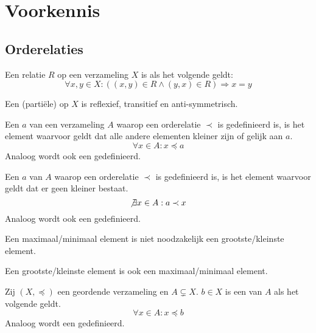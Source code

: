 \documentclass[main.tex]{subfiles}
\begin{document}
\chapter{Voorkennis}
\label{cha:voorkennis}

\section{Orderelaties}
\label{sec:orderelaties}


\begin{de}
  Een relatie $R$ op een verzameling $X$ is  als het volgende geldt:
  \[ \forall x,y \in X: ((x,y) \in R \wedge (y,x) \in R) \Rightarrow x = y \]
\end{de}

\begin{de}
  Een (parti\"ele)  op $X$ is reflexief, transitief en anti-symmetrisch.
\end{de}

\begin{de}
  Een  $a$ van een verzameling $A$ waarop een orderelatie $\prec$ is gedefinieerd is, is het element waarvoor geldt dat alle andere elementen kleiner zijn of gelijk aan $a$.
  \[ \forall x \in A: x \preceq a \] 
  Analoog wordt ook een  gedefinieerd.
\end{de}

\begin{de}
  Een  $a$ van $A$ waarop een orderelatie $\prec$ is gedefinieerd is, is het element waarvoor geldt dat er geen kleiner bestaat.
  \[ \not\exists x \in A: a \prec x \]
  Analoog wordt ook een  gedefinieerd.
\end{de}

\begin{opm}
  Een maximaal/minimaal element is niet noodzakelijk een grootste/kleinste element.    
\end{opm}

\begin{st}
  Een grootste/kleinste element is ook een maximaal/minimaal element.
\end{st}

\begin{de}
  Zij $(X,\preceq)$ een geordende verzameling en $A \subsetneq X$.
  $b \in X$ is een  van $A$ als het volgende geldt.
  \[ \forall x \in A: x \preceq b \]
  Analoog wordt een  gedefinieerd.
\end{de}
\end{document}
